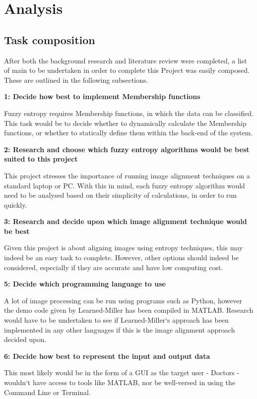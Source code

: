 \section{Analysis}

\subsection{Task composition}

After both the background research and literature review were completed, a list of main  to be undertaken in order to complete this Project was easily composed. These are outlined in the following subsections.

\noindent \textbf{1: Decide how best to implement Membership functions}

Fuzzy entropy requires Membership functions, in which the data can be classified. This task would be to decide whether to dynamically calculate the Membership functions, or whether to statically define them within the back-end of the system.

\noindent \textbf{2: Research and choose which fuzzy entropy algorithms would be best suited to this project}

This project stresses the importance of running image alignment techniques on a standard laptop or PC. With this in mind, each fuzzy entropy algorithm would need to be analysed based on their simplicity of calculations, in order to run quickly.

\noindent \textbf{3: Research and decide upon which image alignment technique would be best}

Given this project is about aligning images using entropy techniques, this may indeed be an easy task to complete. However, other options should indeed be considered, especially if they are accurate and have low computing cost.

\noindent \textbf{5: Decide which programming language to use}

A lot of image processing can be run using programs such as Python, however the demo code given by Learned-Miller \cite{joint-alignment} has been compiled in MATLAB. Research would have to be undertaken to see if Learned-Miller`s approach has been implemented in any other languages if this is the image alignment approach decided upon.

\noindent \textbf{6: Decide how best to represent the input and output data}

This most likely would be in the form of a \acrshort{GUI} as the target user - Doctors - wouldn`t have access to tools like MATLAB, nor be well-versed in using the Command Line or Terminal.

